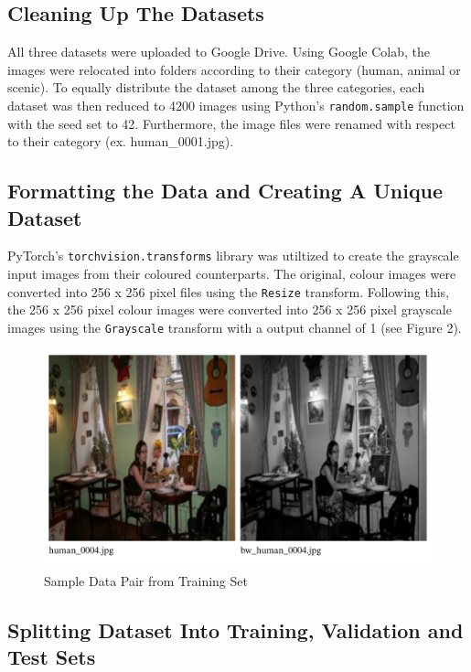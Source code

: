 \documentclass{article} %
\begin{document}
\subsection{Cleaning Up The Datasets}

All three datasets were uploaded to Google Drive. Using Google Colab, the images were relocated into folders according to their category (human, animal or scenic). To equally distribute the dataset among the three categories, each dataset was then reduced to 4200 images using Python’s \verb|random.sample| function with the seed set to 42. Furthermore, the image files were renamed with respect to their category (ex. human\_0001.jpg). 

\subsection{Formatting the Data and Creating A Unique Dataset}

PyTorch’s \verb|torchvision.transforms| library was utiltized to create the grayscale input images from their coloured counterparts. The original, colour images were converted into 256 x 256 pixel files using the \verb|Resize| transform. Following this, the 256 x 256 pixel colour images were converted into 256 x 256 pixel grayscale images using the \verb|Grayscale| transform with a output channel of 1 (see Figure 2). 

\begin{figure}[h]            %
  \centering
  \includegraphics[width=1\linewidth]{Figs/Data Example.png}
  \caption{Sample Data Pair from Training Set}
  \label{fig:data_example}
\end{figure}

 \subsection{Splitting Dataset Into Training, Validation and Test Sets}
\end{document}
